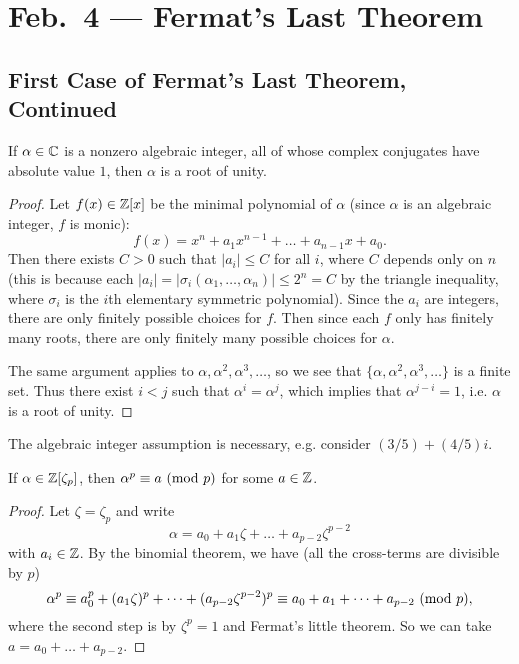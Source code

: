\chapter{Feb.~4 --- Fermat's Last Theorem}

\section{First Case of Fermat's Last Theorem, Continued}

\begin{theorem}[Kronecker]
  If $\alpha \in \mathbb{C}$ is a nonzero algebraic integer,
  all of whose complex conjugates have absolute value
  $1$, then $\alpha$ is a root of unity.
\end{theorem}

\begin{proof}
  Let $f(x) \in \mathbb{Z}[x]$ be the minimal polynomial
  of $\alpha$ (since $\alpha$ is an algebraic integer,
  $f$ is monic):
  \[
    f(x) = x^n + a_{1} x^{n - 1} + \dots + a_{n - 1} x + a_0.
  \]
  Then there exists $C > 0$ such that $|a_i| \le C$
  for all $i$, where $C$ depends only on $n$ (this is
  because each $|a_i| = |\sigma_i(\alpha_1, \dots, \alpha_n)| \le 2^n = C$ by the triangle inequality, where $\sigma_i$ is the $i$th elementary
  symmetric polynomial).  Since the
  $a_i$ are integers, there are only finitely possible
  choices for $f$. Then since each $f$ only has finitely
  many roots, there are only finitely many possible
  choices for $\alpha$.

  The same argument applies
  to $\alpha, \alpha^2, \alpha^3, \dots$, so we see that
  $\{\alpha, \alpha^2, \alpha^3, \dots\}$ is a finite
  set. Thus there exist $i < j$ such that
  $\alpha^i = \alpha^j$, which implies
  that $\alpha^{j - i} = 1$, i.e. $\alpha$ is a
  root of unity.
\end{proof}

\begin{remark}
  The algebraic integer assumption is necessary, e.g.
  consider $(3 / 5) + (4 / 5) i$.
\end{remark}

\begin{lemma}
  If $\alpha \in \mathbb{Z}[\zeta_p]$, then $\alpha^p \equiv a \ (\mathrm{mod}\ p)$
  for some $a \in \mathbb{Z}$.
\end{lemma}

\begin{proof}
  Let $\zeta = \zeta_p$ and write
  \[
    \alpha = a_0 + a_1 \zeta + \dots + a_{p - 2} \zeta^{p - 2}
  \]
  with $a_i \in \mathbb{Z}$. By the binomial theorem, we have
  (all the cross-terms are divisible by $p$)
  \[
    \alpha^p \equiv a_0^p + (a_1 \zeta)^p + \dots + (a_{p - 2} \zeta^{p - 2})^p
    \equiv a_0 + a_1 + \dots + a_{p - 2} \ (\mathrm{mod}\ p),
  \]
  where the second step is by
  $\zeta^p = 1$ and Fermat's little theorem.
  So we can take $a = a_0 + \dots + a_{p - 2}$.
\end{proof}

